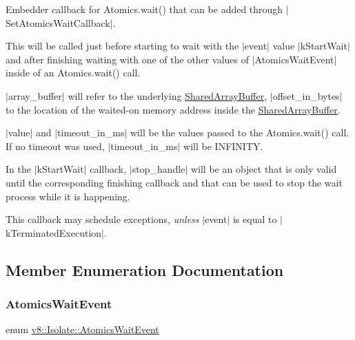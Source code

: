 Embedder callback for {\ttfamily Atomics.\+wait()} that can be added through $\vert$\+Set\+Atomics\+Wait\+Callback$\vert$.

This will be called just before starting to wait with the $\vert$event$\vert$ value $\vert$k\+Start\+Wait$\vert$ and after finishing waiting with one of the other values of $\vert$\+Atomics\+Wait\+Event$\vert$ inside of an {\ttfamily Atomics.\+wait()} call.

$\vert$array\+\_\+buffer$\vert$ will refer to the underlying \mbox{\hyperlink{classv8_1_1SharedArrayBuffer}{Shared\+Array\+Buffer}}, $\vert$offset\+\_\+in\+\_\+bytes$\vert$ to the location of the waited-\/on memory address inside the \mbox{\hyperlink{classv8_1_1SharedArrayBuffer}{Shared\+Array\+Buffer}}.

$\vert$value$\vert$ and $\vert$timeout\+\_\+in\+\_\+ms$\vert$ will be the values passed to the {\ttfamily Atomics.\+wait()} call. If no timeout was used, $\vert$timeout\+\_\+in\+\_\+ms$\vert$ will be {\ttfamily I\+N\+F\+I\+N\+I\+TY}.

In the $\vert$k\+Start\+Wait$\vert$ callback, $\vert$stop\+\_\+handle$\vert$ will be an object that is only valid until the corresponding finishing callback and that can be used to stop the wait process while it is happening.

This callback may schedule exceptions, {\itshape unless} $\vert$event$\vert$ is equal to $\vert$k\+Terminated\+Execution$\vert$. 

\subsection{Member Enumeration Documentation}
\mbox{\label{classv8_1_1Isolate_aa4cfd46a1a22b1ec8fd061c7bbb8b331}} 
\subsubsection{\texorpdfstring{Atomics\+Wait\+Event}{AtomicsWaitEvent}}
{\footnotesize\ttfamily enum \mbox{\hyperlink{classv8_1_1Isolate_aa4cfd46a1a22b1ec8fd061c7bbb8b331}{v8\+::\+Isolate\+::\+Atomics\+Wait\+Event}}\hspace{0.3cm}{\ttfamily [strong]}}

